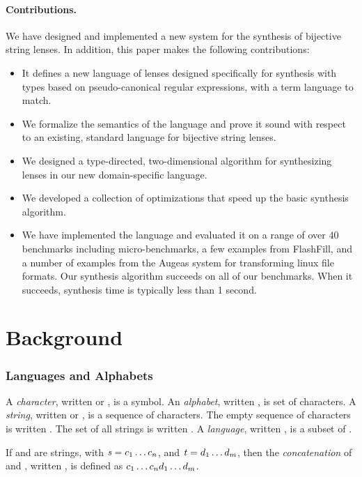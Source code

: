 \documentclass[numbers]{sigplanconf}
\begin{document}
\paragraph*{Contributions.}  We have designed and implemented
a new system for the synthesis of bijective string lenses.
In addition, this paper makes the following contributions:

\begin{itemize}
\item It defines a new language of lenses designed specifically for synthesis
with types based on pseudo-canonical regular expressions, with a term 
language to match.
\item We formalize the semantics of the language and prove it sound with
respect to an existing, standard language for bijective string lenses.
\item We designed a type-directed, two-dimensional 
algorithm for synthesizing lenses in our new domain-specific language.
\item We developed a collection of optimizations that speed up the basic
synthesis algorithm.
\item We have implemented the language and evaluated it on a range of
over 40 benchmarks including micro-benchmarks, a few examples from FlashFill,
and a number of examples from the Augeas system for transforming linux
file formats.  Our synthesis algorithm succeeds on all of our
benchmarks.  When it succeeds, synthesis time is typically less than 1 second.
\end{itemize}

\section{Background}

\subsubsection{Languages and Alphabets}

A \textit{character}, written \Character{} or \CharacterAlt{}, is a symbol.
An \textit{alphabet}, written \Alphabet{}, is set of characters.
A \textit{string}, written \String{} or \StringAlt{}, is a sequence of characters.
The empty sequence of characters is written \EmptyString{}.
The set of all strings is written \StarOf{\Alphabet}.
A \textit{language}, written \Language{}, is a subset of \StarOf{\Alphabet}.

If \String{} and \StringAlt{} are strings, with
$\mathit{s}=c_1\ldots c_n$,
and $\mathit{t}=d_1\ldots d_m$,
then the \textit{concatenation} of \String{} and \StringAlt{},
written \String{}\Concat\StringAlt{}, is defined as
$c_1\ldots c_nd_1\ldots d_m$.
\end{document}
